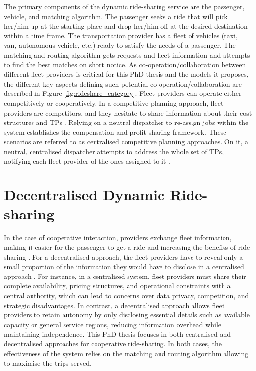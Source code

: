 The primary components of the dynamic ride-sharing service are the passenger, vehicle, and matching algorithm. The passenger seeks a ride that will pick her/him up at the starting place and drop her/him off at the desired destination within a time frame. The transportation provider has a fleet of vehicles (taxi, van, autonomous vehicle, etc.) ready to satisfy the needs of a passenger. The matching and routing algorithm gets requests and fleet information and attempts to find the best matches on short notice. As co-operation/collaboration between different fleet providers is critical for this PhD thesis and the models it proposes, the different key aspects defining such potential co-operation/collaboration are described in Figure \ref{fig:rideshare_category}. Fleet providers can operate either competitively or cooperatively. In a competitive planning approach, fleet providers are competitors, and they hesitate to share information about their cost structures and TPs  \cite{agatz2012optimization}. Relying on a neutral dispatcher to re-assign jobs within the system establishes the compensation and profit sharing framework. These scenarios are referred to as centralised competitive planning approaches. On it, a neutral, centralised dispatcher attempts to address the whole set of TPs, notifying each fleet provider of the ones assigned to it \cite{agatz2012optimization}.

\section{Decentralised Dynamic Ride-sharing }
\label{sec:decentralised}

In the case of cooperative interaction, providers exchange fleet information, making it easier for the passenger to get a ride and increasing the benefits of ride-sharing \cite{shen2018integrating}. For a decentralised approach, the fleet providers have to reveal only a small proportion of the information they would have to disclose in a centralised approach \cite{klapp2020decentralized}. For instance, in a centralised system, fleet providers must share their complete availability, pricing structures, and operational constraints with a central authority, which can lead to concerns over data privacy, competition, and strategic disadvantages. In contrast, a decentralised approach allows fleet providers to retain autonomy by only disclosing essential details such as available capacity or general service regions, reducing information overhead while maintaining independence. This PhD thesis focuses in both centralised and decentralised approaches for cooperative ride-sharing. In both cases, the effectiveness of the system relies on the matching and routing algorithm allowing to maximise the trips served.

